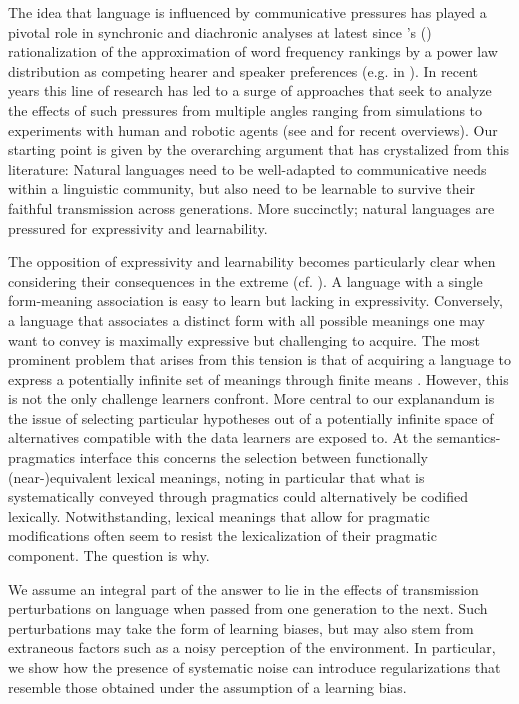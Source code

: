 \documentclass[a4paper]{article}
\newcommand{\citeposs}[2][]{\citeauthor{#2}'s (\citeyear[#1]{#2})}
\begin{document}
The idea that language is influenced by communicative pressures has played a pivotal role in synchronic and diachronic analyses at latest since \citeposs{zipf:1949} rationalization of the approximation of word frequency rankings by a power law distribution as competing hearer and speaker preferences (e.g. in \citealt{martinet:1962, horn:1984,jaeger+vRooij:2007,jaeger:2007, piantadosi:2014,kirby+etal:2015}). In recent years this line of research has led to a surge of approaches that seek to analyze the effects of such pressures from multiple angles ranging from simulations to experiments with human and robotic agents (see \citealt{steels:2015} and \citealt{tamariz+kirby:2016} for recent overviews). Our starting point is given by the overarching argument that has crystalized from this literature: Natural languages need to be well-adapted to communicative needs within a linguistic community, but also need to be learnable to survive their faithful transmission across generations. More succinctly; natural languages are pressured for expressivity and learnability.   

The opposition of expressivity and learnability becomes particularly clear when considering their consequences in the extreme (cf. \citealt{kemp+regier:2012,kirby+etal:2015}). A language with a single form-meaning association is easy to learn but lacking in expressivity. Conversely, a language that associates a distinct form with all possible meanings one may want to convey is maximally expressive but challenging to acquire. The most prominent problem that arises from this tension is that of acquiring a language to express a potentially infinite set of meanings through finite means \citep{kirby:2002}. However, this is not the only challenge learners confront. More central to our explanandum is the issue of selecting particular hypotheses out of a potentially infinite space of alternatives compatible with the data learners are exposed to. At the semantics-pragmatics interface this concerns the selection between functionally (near-)equivalent lexical meanings, noting in particular that what is systematically conveyed through pragmatics could alternatively be codified lexically. Notwithstanding, lexical meanings that allow for pragmatic modifications often seem to resist the lexicalization of their pragmatic component. The question is why.

We assume an integral part of the answer to lie in the effects of transmission perturbations on language when passed from one generation to the next. Such perturbations may take the form of learning biases, but may also stem from extraneous factors such as a noisy perception of the environment. In particular, we show how the presence of systematic noise can introduce regularizations that resemble those obtained under the assumption of a learning bias.  
\end{document}
